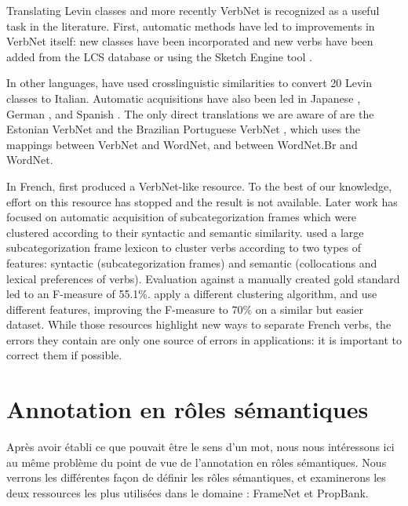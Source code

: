 Translating Levin classes and more recently VerbNet is recognized as a useful
task in the literature. First, automatic methods have led to improvements in
VerbNet itself: new classes have been incorporated
\citep{korhonen2004extended} and new verbs have been added from the LCS
database \citep{dorr2001lcs} or using the Sketch Engine tool
\citep{bonial2013expanding}.

In other languages, \cite{merlo2002multilingual} have used crosslinguistic
similarities to convert 20 Levin classes to Italian. Automatic acquisitions
have also been led in Japanese \citep{suzuki2009classifying}, German
\citep{im2006experiments}, and Spanish \citep{ferrer2004towards}. The
only direct translations we are aware of are the Estonian VerbNet
\citep{jentson2014verbnet} and the Brazilian Portuguese VerbNet
\citep{scarton2012towards}, which uses the mappings between VerbNet and
WordNet, and between WordNet.Br and WordNet.

In French, \cite{saintdizier1996constructing} first produced a VerbNet-like
resource. To the best of our knowledge, effort on this resource has stopped and
the result is not available. Later work has focused on automatic acquisition of
subcategorization frames which were clustered according to their syntactic and
semantic similarity. \cite{sun2010investigating} used a large
subcategorization frame lexicon \citep{messiant2010acquisition} to cluster
verbs according to two types of features: syntactic (subcategorization frames)
and semantic (collocations and lexical preferences of verbs). Evaluation
against a manually created gold standard led to an F-measure of 55.1\%.
\cite{falk2012classifying} apply a different clustering algorithm, and use
different features, improving the F-measure to 70\% on a similar but easier
dataset. While those resources highlight new ways to separate French verbs, the
errors they contain are only one source of errors in applications: it is
important to correct them if possible.


\section{Annotation en rôles sémantiques}
\label{sec:srl}

Après avoir établi ce que pouvait être le sens d'un mot, nous nous intéressons
ici au même problème du point de vue de l'annotation en rôles sémantiques. Nous
verrons les différentes façon de définir les rôles sémantiques, et examinerons
les deux ressources les plus utilisées dans le domaine : FrameNet et PropBank.

